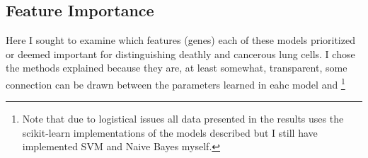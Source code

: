 \subsection{Feature Importance}
Here I sought to examine which features (genes) each of these models prioritized or deemed important for distinguishing deathly and cancerous lung cells.
I chose the methods explained because they are, at least somewhat, transparent, some connection can be drawn between the parameters learned in eahc model and
\footnote{Note that due to logistical issues all data presented in the results uses the scikit-learn implementations of the models described but I still have implemented SVM and Naive Bayes myself.}
